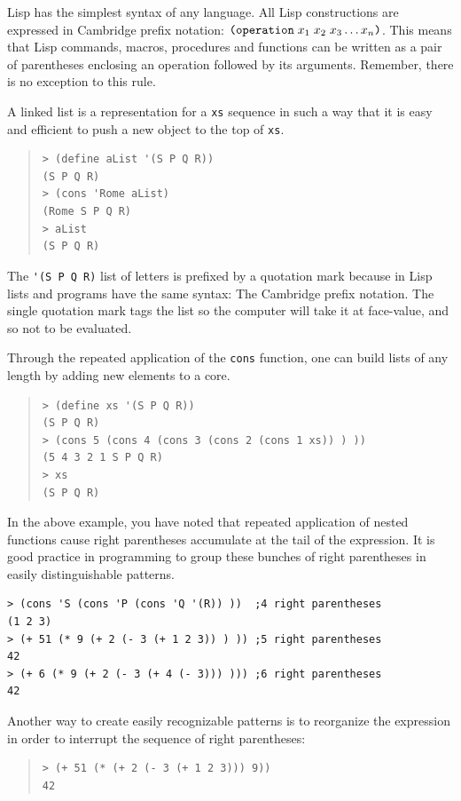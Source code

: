 \documentclass[a4paper,12pt]{book}
\begin{document}
Lisp has the simplest syntax
of any language. All
Lisp constructions are expressed
in Cambridge prefix notation:
$\verb|(operation|\;x_1\;x_2\;x_3\ldots x_n\verb|)|$.
This means that Lisp commands,
macros, procedures and functions
can be written  as a pair of parentheses
enclosing an operation followed
by its arguments. Remember, there is no
exception to this rule.

A linked list is a representation for
a \verb|xs| sequence  in such a way
that it is easy and efficient to
push a new object to the top of \verb|xs|.
\begin{quote}
\begin{verbatim}
> (define aList '(S P Q R))
(S P Q R)
> (cons 'Rome aList)
(Rome S P Q R)
> aList
(S P Q R)
\end{verbatim}
\end{quote}
The \verb|'(S P Q R)| list of letters
is prefixed by a quotation mark because
in Lisp lists and programs have the
same syntax: The Cambridge prefix notation.
The single quotation mark
tags the list so the computer will
take it at face-value, and so not to be evaluated.

Through the repeated application of the
\verb|cons| function, one can
build lists of any length
by adding new elements to
a core.
\begin{quote}
\begin{verbatim}
> (define xs '(S P Q R))
(S P Q R)
> (cons 5 (cons 4 (cons 3 (cons 2 (cons 1 xs)) ) ))
(5 4 3 2 1 S P Q R)
> xs
(S P Q R)
\end{verbatim}
\end{quote}
In the above example, you have noted
that repeated application of nested functions
cause right parentheses accumulate
at the tail of the expression.
It is good practice in programming
to group these bunches of right parentheses
in easily distinguishable patterns.

\begin{verbatim}
> (cons 'S (cons 'P (cons 'Q '(R)) ))  ;4 right parentheses
(1 2 3)
> (+ 51 (* 9 (+ 2 (- 3 (+ 1 2 3)) ) )) ;5 right parentheses
42 
> (+ 6 (* 9 (+ 2 (- 3 (+ 4 (- 3))) ))) ;6 right parentheses
42
\end{verbatim}

Another way to create easily recognizable
patterns  is to
reorganize the expression in order
to interrupt the sequence
of right parentheses:
\begin{quote}
\begin{verbatim}
> (+ 51 (* (+ 2 (- 3 (+ 1 2 3))) 9))
42
\end{verbatim}
\end{quote}
\end{document}
